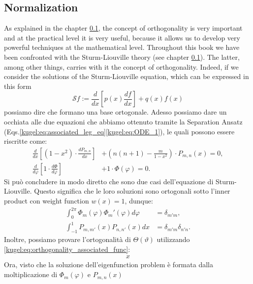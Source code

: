 \subsection{Normalization}


As explained in the chapter \ref{}, the concept of orthogonality is very important and at the practical level it is very useful, because it allows us to develop very powerful techniques at the mathematical level.\newline 
Throughout this book we have been confronted with the Sturm-Liouville theory (see chapter \ref{}). The latter, among other things, carries with it the concept of orthogonality. Indeed, if we consider the solutions of the Sturm-Liouville equation, which can be expressed in this form
\begin{equation}\label{kugel:eq:sturm_liouville}
    \mathcal{S}f := \frac{d}{dx}\left[p(x)\frac{df}{dx}\right]+q(x)f(x)
\end{equation}
possiamo dire che formano una base ortogonale.\newline
Adesso possiamo dare un occhiata alle due equazioni che abbiamo ottenuto tramite la Separation Ansatz (Eqs.\eqref{kugel:eq:associated_leg_eq}\eqref{kugel:eq:ODE_1}), le quali possono essere riscritte come:
\begin{align*}
    \frac{d}{dx} \left[ (1-x^2) \cdot \frac{dP_{m,n}}{dx} \right] &+ \left(n(n+1)-\frac{m}{1-x^2} \right) \cdot P_{m,n}(x) = 0, \\
    \frac{d}{d\varphi} \left[ 1 \cdot \frac{ d\Phi }{d\varphi} \right] &+ 1 \cdot \Phi(\varphi) = 0. 
\end{align*}
Si può concludere in modo diretto che sono due casi dell'equazione di Sturm-Liouville. Questo significa che le loro soluzioni sono ortogonali sotto l'inner product con weight function $w(x)=1$, dunque:
\begin{align}
\int_{0}^{2\pi} \Phi_m(\varphi)\Phi_m'(\varphi) d\varphi &= \delta_{m'm}, \nonumber \\
\int_{-1}^1 P_{m,m'}(x)P_{n,n'}(x) dx &= \delta_{m'm}\delta_{n'n}. \label{kugel:eq:orthogonality_associated_func}
\end{align}
Inoltre, possiamo provare l'ortogonalità di $\Theta(\vartheta)$ utilizzando \eqref{kugel:eq:orthogonality_associated_func}:
\begin{align}
    x
\end{align}
Ora, visto che la soluzione dell'eigenfunction problem è formata dalla moltiplicazione di $\Phi_m(\varphi)$ e $P_{m,n}(x)$
\fi

